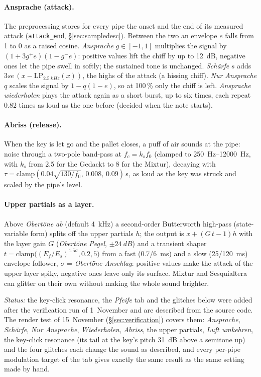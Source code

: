 \documentclass[11pt,a4paper,parskip=half,DIV=11,toc=bibliography]{scrartcl}
\newcommand{\ui}[1]{\emph{#1}}                 %
\newcommand{\code}[1]{\texttt{#1}}
\begin{document}
\paragraph{Ansprache (attack).} The preprocessing stores for every pipe the onset and the end of its measured
attack (\code{attack\_end}, \S\ref{sec:sampledesc}). Between the two an envelope $e$ falls from 1 to 0 as a raised cosine. \ui{Ansprache}
$g\in[-1,1]$ multiplies the signal by $(1+3g^+e)(1-g^-e)$: positive values lift the chiff by up to
\SI{+12}{dB}, negative ones let the pipe swell in softly; the sustained tone is unchanged. \ui{Schärfe} $s$ adds
$3se\,(x-\mathrm{LP}_{\SI{2.5}{kHz}}(x))$, the highs of the attack (a hissing chiff). \ui{Nur Ansprache} $q$ scales the
signal by $1-q(1-e)$, so at 100\,\% only the chiff is left. \ui{Ansprache wiederholen} plays the attack again as a
short burst, up to six times, each repeat $0.82$ times as loud as the one before (decided when the note starts).

\paragraph{Abriss (release).} When the key is let go and the pallet closes, a puff of air sounds at the pipe:
noise through a two-pole band-pass at $f_c=k_s f_0$ (clamped to \SIrange{250}{12000}{Hz}, with $k_s$ from 2.5 for
the Gedackt to 8 for the Mixtur), decaying with $\tau=\mathrm{clamp}(0.04\sqrt{130/f_0},\,0.008,\,0.09)$\,s, as
loud as the key was struck and scaled by the pipe's level.

\paragraph{Upper partials as a layer.} Above \ui{Obertöne ab} (default \SI{4}{kHz}) a second-order Butterworth
high-pass (state-variable form) splits off the upper partials $h$; the output is $x+(G\,t-1)h$ with the layer
gain $G$ (\ui{Obertöne Pegel}, $\pm\SI{24}{dB}$) and a transient shaper
$t=\mathrm{clamp}\bigl((E_f/E_s)^{1.5\sigma},0.2,5\bigr)$ from a fast (0.7/\SI{6}{ms}) and a slow (25/\SI{120}{ms})
envelope follower, $\sigma$ = \ui{Obertöne Anschlag}: positive values make the attack of the upper layer spiky,
negative ones leave only its surface. Mixtur and Sesquialtera can glitter on their own without making the whole
sound brighter.

\emph{Status:} the key-click resonance, the \ui{Pfeife} tab and the glitches below were added after the verification run of
1~November and are described from the source code. The render test of 15~November (\S\ref{sec:verification}) covers them: \ui{Ansprache},
\ui{Schärfe}, \ui{Nur Ansprache}, \ui{Wiederholen}, \ui{Abriss}, the upper partials, \ui{Luft umkehren}, the key-click resonance (its tail at the
key's pitch \SI{31}{dB} above a semitone up) and the four glitches each change the sound as described, and every per-pipe modulation target of
the tab gives exactly the same result as the same setting made by hand.
\end{document}
